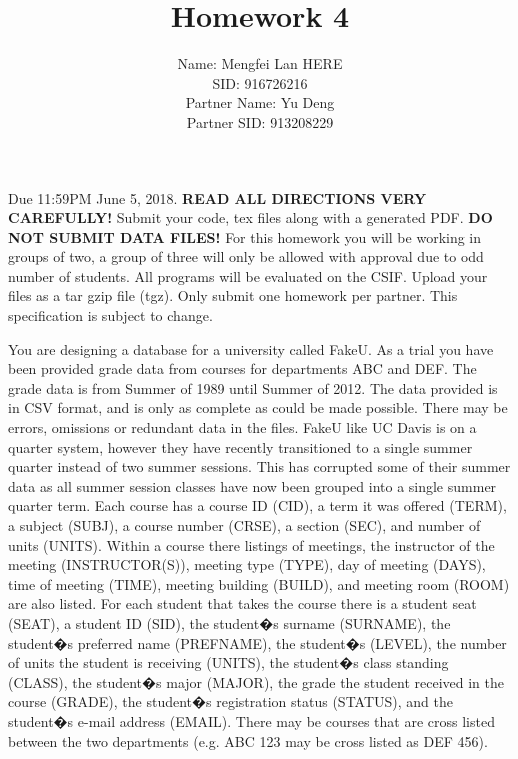 \documentclass{article}
\begin{document}
\title{Homework 4}
\author{Name: Mengfei Lan HERE\\SID: 916726216\\Partner Name: Yu Deng\\Partner SID: 913208229}

\maketitle

Due 11:59PM June 5, 2018. {\bf READ ALL DIRECTIONS VERY CAREFULLY!} 
Submit your code, tex files along with a generated PDF. {\bf DO NOT SUBMIT DATA FILES!} 
For this homework you will be working in groups of two, a group of three will only be allowed with approval due to odd number of students. 
All programs will be evaluated on the CSIF. Upload your files as a tar gzip file (tgz). Only submit one homework per partner. This specification is subject to change.

You are designing a database for a university called FakeU. As a trial you have been provided grade data from courses for departments ABC and DEF. 
The grade data is from Summer of 1989 until Summer of 2012. The data provided is in CSV format, and is only as complete as could be made possible. 
There may be errors, omissions or redundant data in the files. 
FakeU like UC Davis is on a quarter system, however they have recently transitioned to a single summer quarter instead of two summer sessions. 
This has corrupted some of their summer data as all summer session classes have now been grouped into a single summer quarter term. 
Each course has a course ID (CID), a term it was offered (TERM), a subject (SUBJ), a course number (CRSE), a section (SEC), and number of units (UNITS). 
Within a course there listings of meetings, the instructor of the meeting (INSTRUCTOR(S)), meeting type (TYPE), day of meeting (DAYS), time of meeting (TIME), meeting building (BUILD), and meeting room (ROOM) are also listed. For each student that takes the course there is a student seat (SEAT), a student ID (SID), the student�s surname (SURNAME), the student�s preferred name (PREFNAME), the student�s (LEVEL), the number of units the student is receiving (UNITS), the student�s class standing (CLASS), the student�s major (MAJOR), the grade the student received in the course (GRADE), the student�s registration status (STATUS), and the student�s e-mail address (EMAIL).
There may be courses that are cross listed between the two departments (e.g. ABC 123 may be cross listed as DEF 456).
\end{document}
